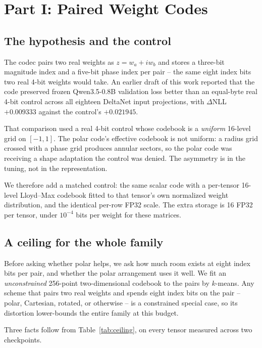 \section{Part I: Paired Weight Codes}
\label{sec:part1}

\subsection{The hypothesis and the control}

The codec pairs two real weights as $z=w_a+iw_b$ and stores a three-bit
magnitude index and a five-bit phase index per pair -- the same eight index bits
two real 4-bit weights would take. An earlier draft of this work reported that
the code preserved frozen Qwen3.5-0.8B validation loss better than an
equal-byte real 4-bit control across all eighteen DeltaNet input projections,
with $\Delta$NLL $+0.009333$ against the control's $+0.021945$.

That comparison used a real 4-bit control whose codebook is a \emph{uniform}
16-level grid on $[-1,1]$. The polar code's effective codebook is not uniform: a
radius grid crossed with a phase grid produces annular sectors, so the polar
code was receiving a shape adaptation the control was denied. The asymmetry is
in the tuning, not in the representation.

We therefore add a matched control: the same scalar code with a per-tensor
16-level Lloyd--Max codebook fitted to that tensor's own normalized weight
distribution, and the identical per-row FP32 scale. The extra storage is 16 FP32
per tensor, under $10^{-4}$ bits per weight for these matrices.

\subsection{A ceiling for the whole family}
\label{sec:ceiling}

Before asking whether polar helps, we ask how much room exists at eight index
bits per pair, and whether the polar arrangement uses it well. We fit an
\emph{unconstrained} 256-point two-dimensional codebook to the pairs by
$k$-means. Any scheme that pairs two real weights and spends eight index bits on
the pair -- polar, Cartesian, rotated, or otherwise -- is a constrained special
case, so its distortion lower-bounds the entire family at this budget.



Three facts follow from Table~\ref{tab:ceiling}, on every tensor measured across
two checkpoints.

